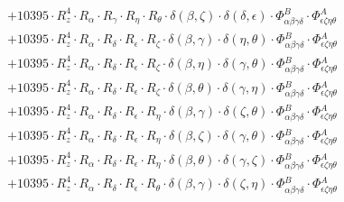 \documentclass{article}
\begin{document}
\begin{equation}
\begin{array}{c}
 \\[0.2em] 		 + 10395 \cdot R_{z}^{4} \cdot R_{\alpha{}} \cdot R_{\gamma{}} \cdot R_{\eta{}} \cdot R_{\theta{}} \cdot \delta{}\left(\beta{}, \zeta{}\right) \cdot \delta{}\left(\delta{}, \epsilon{}\right) \cdot \Phi{}^{B}_{\alpha{}\beta{}\gamma{}\delta{}} \cdot \Phi{}^{A}_{\epsilon{}\zeta{}\eta{}\theta{}} 
 \\[0.2em] 		 + 10395 \cdot R_{z}^{4} \cdot R_{\alpha{}} \cdot R_{\delta{}} \cdot R_{\epsilon{}} \cdot R_{\zeta{}} \cdot \delta{}\left(\beta{}, \gamma{}\right) \cdot \delta{}\left(\eta{}, \theta{}\right) \cdot \Phi{}^{B}_{\alpha{}\beta{}\gamma{}\delta{}} \cdot \Phi{}^{A}_{\epsilon{}\zeta{}\eta{}\theta{}} 
 \\[0.2em] 		 + 10395 \cdot R_{z}^{4} \cdot R_{\alpha{}} \cdot R_{\delta{}} \cdot R_{\epsilon{}} \cdot R_{\zeta{}} \cdot \delta{}\left(\beta{}, \eta{}\right) \cdot \delta{}\left(\gamma{}, \theta{}\right) \cdot \Phi{}^{B}_{\alpha{}\beta{}\gamma{}\delta{}} \cdot \Phi{}^{A}_{\epsilon{}\zeta{}\eta{}\theta{}} 
 \\[0.2em] 		 + 10395 \cdot R_{z}^{4} \cdot R_{\alpha{}} \cdot R_{\delta{}} \cdot R_{\epsilon{}} \cdot R_{\zeta{}} \cdot \delta{}\left(\beta{}, \theta{}\right) \cdot \delta{}\left(\gamma{}, \eta{}\right) \cdot \Phi{}^{B}_{\alpha{}\beta{}\gamma{}\delta{}} \cdot \Phi{}^{A}_{\epsilon{}\zeta{}\eta{}\theta{}} 
 \\[0.2em] 		 + 10395 \cdot R_{z}^{4} \cdot R_{\alpha{}} \cdot R_{\delta{}} \cdot R_{\epsilon{}} \cdot R_{\eta{}} \cdot \delta{}\left(\beta{}, \gamma{}\right) \cdot \delta{}\left(\zeta{}, \theta{}\right) \cdot \Phi{}^{B}_{\alpha{}\beta{}\gamma{}\delta{}} \cdot \Phi{}^{A}_{\epsilon{}\zeta{}\eta{}\theta{}} 
 \\[0.2em] 		 + 10395 \cdot R_{z}^{4} \cdot R_{\alpha{}} \cdot R_{\delta{}} \cdot R_{\epsilon{}} \cdot R_{\eta{}} \cdot \delta{}\left(\beta{}, \zeta{}\right) \cdot \delta{}\left(\gamma{}, \theta{}\right) \cdot \Phi{}^{B}_{\alpha{}\beta{}\gamma{}\delta{}} \cdot \Phi{}^{A}_{\epsilon{}\zeta{}\eta{}\theta{}} 
 \\[0.2em] 		 + 10395 \cdot R_{z}^{4} \cdot R_{\alpha{}} \cdot R_{\delta{}} \cdot R_{\epsilon{}} \cdot R_{\eta{}} \cdot \delta{}\left(\beta{}, \theta{}\right) \cdot \delta{}\left(\gamma{}, \zeta{}\right) \cdot \Phi{}^{B}_{\alpha{}\beta{}\gamma{}\delta{}} \cdot \Phi{}^{A}_{\epsilon{}\zeta{}\eta{}\theta{}} 
 \\[0.2em] 		 + 10395 \cdot R_{z}^{4} \cdot R_{\alpha{}} \cdot R_{\delta{}} \cdot R_{\epsilon{}} \cdot R_{\theta{}} \cdot \delta{}\left(\beta{}, \gamma{}\right) \cdot \delta{}\left(\zeta{}, \eta{}\right) \cdot \Phi{}^{B}_{\alpha{}\beta{}\gamma{}\delta{}} \cdot \Phi{}^{A}_{\epsilon{}\zeta{}\eta{}\theta{}} 

\end{array}
\end{equation}
\end{document}
